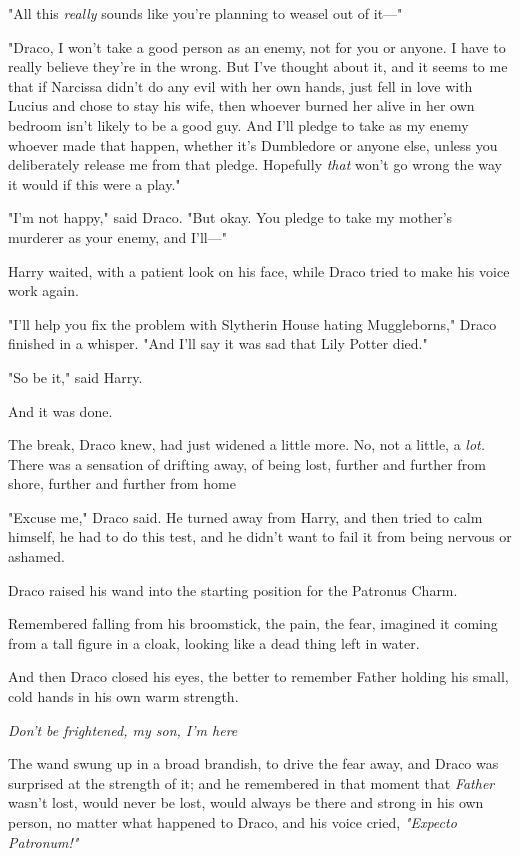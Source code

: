 "All this \emph{really} sounds like you're planning to weasel out of it\mbox{---}"

"Draco, I won't take a good person as an enemy, not for you or anyone. I have
to really believe they're in the wrong. But I've thought about it, and it seems
to me that if Narcissa didn't do any evil with her own hands, just fell in love
with Lucius and chose to stay his wife, then whoever burned her alive in her
own bedroom isn't likely to be a good guy. And I'll pledge to take as my enemy
whoever made that happen, whether it's Dumbledore or anyone else, unless you
deliberately release me from that pledge. Hopefully \emph{that} won't go wrong
the way it would if this were a play."

"I'm not happy," said Draco. "But okay. You pledge to take my mother's murderer
as your enemy, and I'll\mbox{---}"

Harry waited, with a patient look on his face, while Draco tried to make his
voice work again.

"I'll help you fix the problem with Slytherin House hating Muggleborns," Draco
finished in a whisper. "And I'll say it was sad that Lily Potter died."

"So be it," said Harry.

And it was done.

The break, Draco knew, had just widened a little more. No, not a little, a
\emph{lot.} There was a sensation of drifting away, of being lost, further and
further from shore, further and further from home{\el}

"Excuse me," Draco said. He turned away from Harry, and then tried to calm
himself, he had to do this test, and he didn't want to fail it from being
nervous or ashamed.

Draco raised his wand into the starting position for the Patronus Charm.

Remembered falling from his broomstick, the pain, the fear, imagined it coming
from a tall figure in a cloak, looking like a dead thing left in water.

And then Draco closed his eyes, the better to remember Father holding his
small, cold hands in his own warm strength.

\emph{Don't be frightened, my son, I'm here{\el}}

The wand swung up in a broad brandish, to drive the fear away, and Draco was
surprised at the strength of it; and he remembered in that moment that
\emph{Father} wasn't lost, would never be lost, would always be there and
strong in his own person, no matter what happened to Draco, and his voice
cried, \emph{"Expecto Patronum!"}

